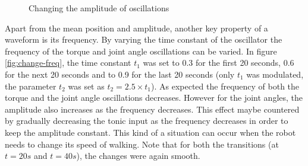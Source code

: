 \documentclass[12pt,twoside]{article}
\theoremstyle{plain}
\theoremstyle{definition}
\theoremstyle{remark}
\newcommand{\forceindent}{\leavevmode{\parindent=2em\indent}}
\begin{document}
\begin{figure}[H]
\centering     %
{}
\caption{Changing the amplitude of oscillations}
\label{fig:change-amp}
\end{figure}

\forceindent Apart from the mean position and amplitude, another key property of a waveform is its frequency. By varying the time constant of the oscillator the frequency of the torque and joint angle oscillations can be varied. In figure \ref{fig:change-freq}, the time constant $t_1$ was set to 0.3 for the first 20 seconds, 0.6 for the next 20 seconds and to 0.9 for the last 20 seconds (only $t_1$ was modulated, the parameter $t_2$ was set as $t_2 = 2.5 \times t_1$). As expected the frequency of both the torque and the joint angle oscillations decreases. However for the joint angles, the amplitude also increases as the frequency decreases. This effect maybe countered by gradually decreasing the tonic input as the frequency decreases in order to keep the amplitude constant. This kind of a situation can occur when the robot needs to change its speed of walking. Note that for both the  transitions (at $t=20s$ and $t=40s$), the changes were again smooth. 
\end{document}
